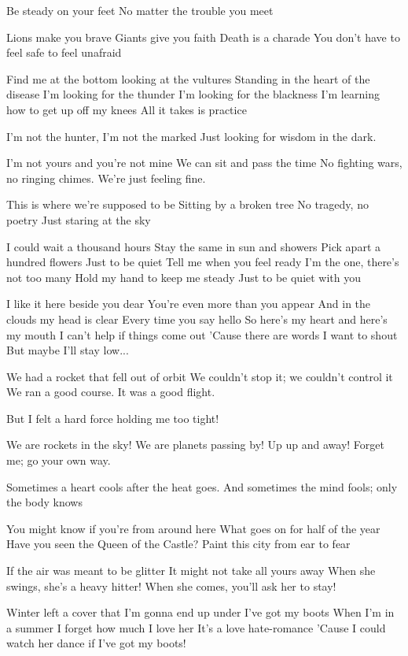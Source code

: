 Be steady on your feet
No matter the trouble you meet

Lions make you brave
Giants give you faith
Death is a charade
You don't have to feel safe to feel unafraid

Find me at the bottom looking at the vultures
Standing in the heart of the disease
I'm looking for the thunder
I'm looking for the blackness
I'm learning how to get up off my knees
All it takes is practice

I'm not the hunter, I'm not the marked
Just looking for wisdom in the dark.


I'm not yours and you're not mine
We can sit and pass the time
No fighting wars, no ringing chimes.
We're just feeling fine.

This is where we're supposed to be
Sitting by a broken tree
No tragedy, no poetry
Just staring at the sky

I could wait a thousand hours
Stay the same in sun and showers
Pick apart a hundred flowers
Just to be quiet
Tell me when you feel ready
I'm the one, there's not too many
Hold my hand to keep me steady
Just to be quiet with you

I like it here beside you dear
You're even more than you appear
And in the clouds my head is clear
Every time you say hello
So here's my heart and here's my mouth
I can't help if things come out
'Cause there are words I want to shout
But maybe I'll stay low...


We had a rocket that fell out of orbit
We couldn't stop it; we couldn't control it
We ran a good course. It was a good flight.

But I felt a hard force holding me too tight!

We are rockets in the sky!
We are planets passing by!
Up up and away!
Forget me; go your own way.

Sometimes a heart cools after the heat goes.
And sometimes the mind fools; only the body knows


You might know if you're from around here
What goes on for half of the year
Have you seen the Queen of the Castle?
Paint this city from ear to fear

If the air was meant to be glitter
It might not take all yours away
When she swings, she's a heavy hitter!
When she comes, you'll ask her to stay!

Winter left a cover that I'm gonna end up under
I've got my boots
When I'm in a summer I forget how much I love her
It's a love hate-romance
'Cause I could watch her dance if I've got my boots!

